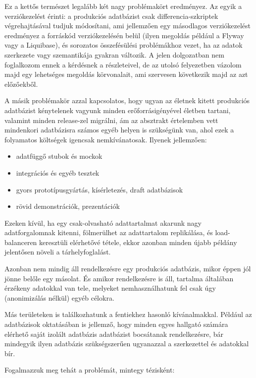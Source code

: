 \documentclass[
    parspace,
    noindent,
    nohyp,
]{elteiktdk}[2023/04/10]
\begin{document}
Ez a kettős természet legalább két nagy problémakört eredményez.
Az egyik a verziókezelést érinti:
a produkciós adatbázist csak differencia-szkriptek végrehajtásával tudjuk módosítani,
ami jellemzően egy másodlagos verziókezelést eredményez a forráskód verziókezelésén belül
(ilyen megoldás például a Flyway vagy a Liquibase),
és sorozatos összefésülési problémákhoz vezet, ha az adatok szerkezete vagy szemantikája gyakran változik.
A jelen dolgozatban nem foglalkozom ennek a kérdésnek a részleteivel,
de az utolsó felyezetben vázolom majd egy lehetséges megoldás körvonalait,
ami szervesen következik majd az azt előzőekből.

A másik problémakör azzal kapcsolatos, hogy ugyan az életnek kitett produkciós adatbázist
kénytelenek vagyunk minden erőforrásigényével életben tartani, valamint minden release-zel migrálni,
ám az absztrakt értelemben vett mindenkori adatbázisra számos egyéb helyen is szükségünk van,
ahol ezek a folyamatos költségek igencsak nemkívánatosak.
Ilyenek jellemzően:

\begin{itemize}
    \item adatfüggő stubok és mockok
    \item integrációs és egyéb tesztek
    \item gyors prototípusgyártás, kísérletezés, draft adatbázisok
    \item rövid demonstrációk, prezentációk
\end{itemize}

Ezeken kívül, ha egy csak-olvasható adattartalmat akarunk nagy adatforgalomnak kitenni,
fölmerülhet az adattartalom replikálása, és load-balanceren keresztüli elérhetővé tétele,
ekkor azonban minden újabb példány jelentősen növeli a tárhelyfoglalást.

Azonban nem mindig áll rendelkezésre egy produkciós adatbázis,
mikor éppen jól jönne belőle egy másolat.
És amikor rendelkezésre is áll, tartalma általában érzékeny adatokkal van tele,
melyeket nemhasználhatunk fel csak úgy (anonimizálás nélkül) egyéb célokra.

Más területeken is találkozhatunk a fentiekhez hasonló kívánalmakkal.
Például az adatbázisok oktatásában is jellemző, hogy minden egyes hallgató
számára elérhető saját izolált adatbázis adatbázist bocsátanak rendelkezésre,
bár mindegyik ilyen adatbázis szükségszerűen ugyanazzal a szerkezettel és adatokkal bír.

Fogalmazzuk meg tehát a problémát, mintegy tézisként:
\end{document}
